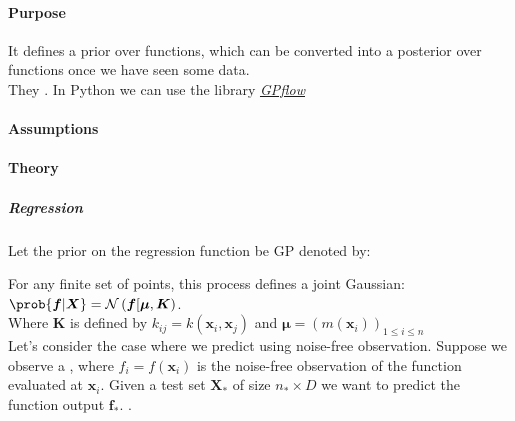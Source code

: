 \paragraph{Purpose}
It defines a prior over functions, which can be converted into a posterior over 
functions once we have seen some data.\\
They .
In Python we can use the library \href{https://gpflow.github.io/GPflow/develop/index.html}{\emph{
GPflow}}
\paragraph{Assumptions}
\paragraph{Theory}
\subparagraph{Regression}
Let the prior on the regression function be GP denoted by:
\begin{center}
\end{center}
For any finite set of points, this process defines a joint Gaussian:
$\prob{\bm{f}|\bm{X}} = \mathcal{N}\left(\bm{f}[\bm{\mu},\bm{K}\right)$.\\
Where $\bm{K}$ is defined by $k_{ij}=k(\bm{x}_{i}, \bm{x}_{j})$ and $\bm{\mu}=\left(m(\bm{x}_{i})
\right)_{1\leq i\leq n}$\\
Let's consider the case where we predict using noise-free observation.
Suppose we observe a , where $f_{i} = f(\bm{x}_{i})$ is the noise-free observation of the function 
evaluated at $\bm{x}_{i}$. Given a test set $\bm{X}_{*}$ of size $n_{*}\times D$ we want to predict
the function output $\bm{f}_{*}$.
.
\begin{center}
\end{center}

